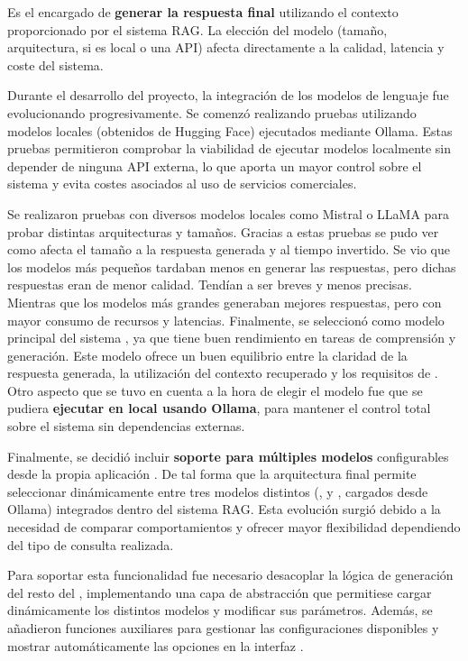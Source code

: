 Es el encargado de \textbf{generar la respuesta final} utilizando el contexto proporcionado por el sistema RAG. La elección del modelo (tamaño, arquitectura, si es local o una API) afecta directamente a la calidad, latencia y coste del sistema.

Durante el desarrollo del proyecto, la integración de los modelos de lenguaje fue evolucionando progresivamente. Se comenzó realizando pruebas utilizando modelos locales (obtenidos de Hugging Face) ejecutados mediante Ollama. Estas pruebas permitieron comprobar la viabilidad de ejecutar modelos localmente sin depender de ninguna API externa, lo que aporta un mayor control sobre el sistema y evita costes asociados al uso de servicios comerciales.

Se realizaron pruebas con diversos modelos locales como Mistral o LLaMA para probar distintas arquitecturas y tamaños. Gracias a estas pruebas se pudo ver como afecta el tamaño a la respuesta generada y al tiempo invertido. Se vio que los modelos más pequeños tardaban menos en generar las respuestas, pero dichas respuestas eran de menor calidad. Tendían a ser breves y menos precisas. Mientras que los modelos más grandes generaban mejores respuestas, pero con mayor consumo de recursos y latencias. Finalmente, se seleccionó como modelo principal del sistema , ya que tiene buen rendimiento en tareas de comprensión y generación. Este modelo ofrece un buen equilibrio entre la claridad de la respuesta generada, la utilización del contexto recuperado y los requisitos de . Otro aspecto que se tuvo en cuenta a la hora de elegir el modelo fue que se pudiera \textbf{ejecutar en local usando Ollama}, para mantener el control total sobre el sistema sin dependencias externas. 
 
Finalmente, se decidió incluir \textbf{soporte para múltiples modelos} configurables desde la propia aplicación . De tal forma que la arquitectura final permite seleccionar dinámicamente entre tres modelos distintos (,  y , cargados desde Ollama) integrados dentro del sistema RAG. Esta evolución surgió debido a la necesidad de comparar comportamientos y ofrecer mayor flexibilidad dependiendo del tipo de consulta realizada.  
 
Para soportar esta funcionalidad fue necesario desacoplar la lógica de generación del resto del , implementando una capa de abstracción que permitiese cargar dinámicamente los distintos modelos y modificar sus parámetros. Además, se añadieron funciones auxiliares para gestionar las configuraciones disponibles y mostrar automáticamente las opciones en la interfaz .
 
